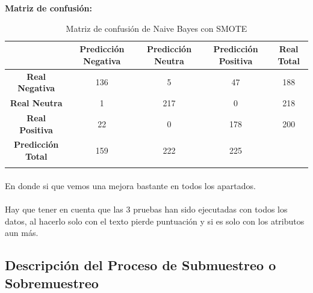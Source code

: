 \documentclass{report}
\begin{document}
{\begin{center}
{                    \textbf{Matriz de confusión: }


                    \begin{longtable}{|c|c|c|c|c|}
                    \hline
                     & \textbf{Predicción Negativa} & \textbf{Predicción Neutra} & \textbf{Predicción Positiva} & \textbf{Real Total} \\ \hline
                    \endhead
                    \textbf{Real Negativa} & 136 & 5 & 47 & 188\\ \hline
                    \textbf{Real Neutra} & 1 & 217 & 0 & 218\\ \hline
                    \textbf{Real Positiva} & 22 & 0 & 178 & 200\\ \hline
                    \textbf{Predicción Total} & 159 & 222 & 225  & \\
                    \hline
                    \caption{Matriz de confusión de Naive Bayes con SMOTE}
                    \end{longtable}}
                    \end{center}
                \paragraph*{}{
                    En donde si que vemos una mejora bastante en todos los apartados.
                }
               \paragraph*{}{
                   Hay que tener en cuenta que las 3 pruebas han sido ejecutadas con todos los datos, al hacerlo solo con el texto pierde puntuación y si es solo con los atributos aun más.
               }
            \clearpage\subsection{Descripción del Proceso de Submuestreo o Sobremuestreo}
}
\end{document}
